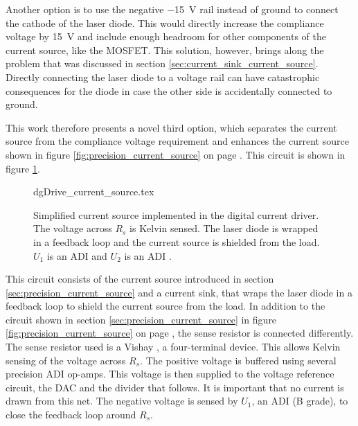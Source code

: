 Another option is to use the negative \qty{-15}{\V} rail instead of ground to connect the cathode of the laser diode. This would directly increase the compliance voltage by \qty{15}{\V} and include enough headroom for other components of the current source, like the MOSFET. This solution, however, brings along the problem that was discussed in section \ref{sec:current_sink_current_source}. Directly connecting the laser diode to a voltage rail can have catastrophic consequences for the diode in case the other side is accidentally connected to ground.

This work therefore presents a novel third option, which separates the current source from the compliance voltage requirement and enhances the current source shown in figure \ref{fig:precision_current_source} on page \pageref{fig:precision_current_source}. This circuit is shown in figure \ref{fig:dgDrive_current_source}.
\begin{figure}[ht]
    \centering
        {dgDrive_current_source.tex}
    \caption{Simplified current source implemented in the digital current driver. The voltage across $R_s$ is Kelvin sensed. The laser diode is wrapped in a feedback loop and the current source is shielded from the load. $U_1$ is an ADI  and $U_2$ is an ADI .}
    \label{fig:dgDrive_current_source}
\end{figure}

This circuit consists of the current source introduced in section \ref{sec:precision_current_source} and a current sink, that wraps the laser diode in a feedback loop to shield the current source from the load. In addition to the circuit shown in section \ref{sec:precision_current_source} in figure \ref{fig:precision_current_source} on page \pageref{fig:precision_current_source}, the sense resistor is connected differently. The sense resistor used is a Vishay  \cite{datasheet_VPR}, a four-terminal device. This allows Kelvin sensing of the voltage across $R_s$. The positive voltage is buffered using several precision ADI  \cite{datasheet_ADA4077} op-amps. This voltage is then supplied to the voltage reference circuit, the DAC and the divider that follows. It is important that no current is drawn from this net. The negative voltage is sensed by $U_1$, an ADI  (B grade), to close the feedback loop around $R_s$.

